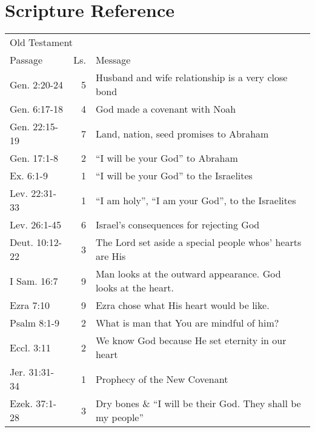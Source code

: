\clearpage
\section*{Scripture Reference}

\begin{table}[ht]%
\centering
\begin{tabular}{lrp{11cm}}
\toprule
\multicolumn{3}{l}{Old Testament}\\
Passage & Ls. & Message \\
\midrule
Gen. 2:20-24    & 5  & Husband and wife relationship is a very close bond\\
Gen. 6:17-18    & 4  & God made a covenant with Noah \\
Gen. 22:15-19   & 7  & Land, nation, seed promises to Abraham\\
Gen. 17:1-8     & 2  & ``I will be your God'' to Abraham\\
Ex. 6:1-9       & 1  & ``I will be your God'' to the Israelites\\
Lev. 22:31-33   & 1  & ``I am holy'', ``I am your God'', to the Israelites\\
Lev. 26:1-45    & 6  & Israel's consequences for rejecting God\\
Deut. 10:12-22  & 3  & The Lord set aside a special people whos' hearts are His\\
I Sam. 16:7     & 9  & Man looks at the outward appearance.  God looks at the heart.\\
Ezra 7:10       & 9  & Ezra chose what His heart would be like.\\
Psalm 8:1-9     & 2  & What is man that You are mindful of him?\\
Eccl. 3:11      & 2  & We know God because He set eternity in our heart\\
Jer. 31:31-34   & 1  & Prophecy of the New Covenant\\
Ezek. 37:1-28   & 3  & Dry bones \& ``I will be their God.  They shall be my people''\\
\bottomrule
\end{tabular}
\label{tab:ScriptureReferenceOT}
\end{table}
\clearpage

